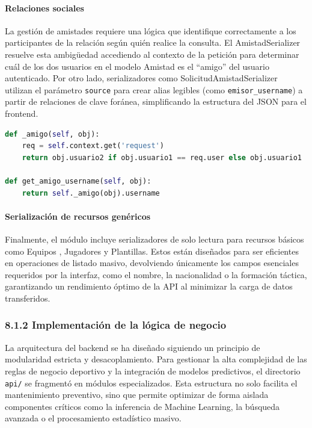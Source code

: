 \paragraph{Relaciones sociales}

La gestión de amistades requiere una lógica que identifique correctamente a los participantes de la relación
 según quién realice la consulta. El AmistadSerializer resuelve esta ambigüedad accediendo al contexto de la 
 petición para determinar cuál de los dos usuarios en el modelo Amistad es el ``amigo'' del usuario
  autenticado. Por otro lado, serializadores como SolicitudAmistadSerializer utilizan el parámetro \texttt{source}
   para crear alias legibles (como \texttt{emisor\_username}) a partir de relaciones de clave foránea, simplificando
 la estructura del JSON para el frontend.

\begin{lstlisting}[language=Python,caption={Resolución ambigua de 
relaciones sociales en serializers mediante context}]
def _amigo(self, obj):
    req = self.context.get('request')
    return obj.usuario2 if obj.usuario1 == req.user else obj.usuario1

def get_amigo_username(self, obj): 
    return self._amigo(obj).username
\end{lstlisting}

\paragraph{Serialización de recursos genéricos}

Finalmente, el módulo incluye serializadores de solo lectura para recursos básicos como Equipos
, Jugadores y Plantillas. Estos están diseñados para ser eficientes en operaciones de listado masivo,
 devolviendo únicamente los campos esenciales requeridos por la interfaz, como el nombre, la nacionalidad
  o la formación táctica, garantizando un rendimiento óptimo de la API al minimizar la carga de datos transferidos.

\subsubsection{8.1.2 Implementación de la lógica de negocio}

La arquitectura del backend se ha diseñado siguiendo un principio de modularidad estricta y desacoplamiento.
 Para gestionar la alta complejidad de las reglas de negocio deportivo y la integración de modelos predictivos, 
 el directorio \texttt{api/} se fragmentó en módulos especializados. Esta estructura no solo facilita el mantenimiento preventivo,
  sino que permite optimizar de forma aislada componentes críticos como la inferencia de Machine Learning, la búsqueda avanzada o el procesamiento estadístico masivo.

